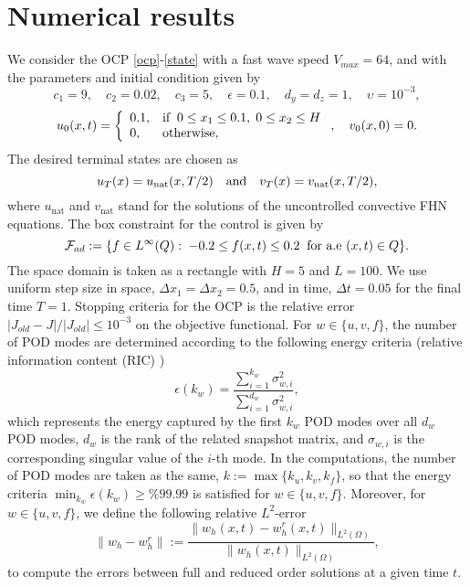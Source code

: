 \documentclass[preprint,12pt]{elsarticle}
\begin{document}
\section{Numerical results}
\label{numeric}

We consider the OCP \eqref{ocp}-\eqref{state} with a fast wave speed $V_{max}=64$, and with the parameters and initial condition given by
\[
c_1=9, \quad c_2 = 0.02, \quad c_3 = 5, \quad \epsilon = 0.1, \quad d_{y}=d_{z}=1, \quad \upsilon =10^{-3},
\]
\[
u_0(x,t) = \left\{
             \begin{array}{ll}
               0.1, & \hbox{if} \;\; 0 \leq x_1 \leq 0.1,\; 0 \leq x_2 \leq H  \\
               0, & \hbox{otherwise},
             \end{array}
           \right.
, \quad
v_0(x,0) = 0.
\]
The desired terminal states are chosen as
\[
u_T(x) = u_{\mathrm{nat}}(x,T/2) \quad \hbox{and} \quad v_T(x) = v_{\mathrm{nat}}(x,T/2),
\]
where $u_{\mathrm{nat}}$ and $v_{\mathrm{nat}}$ stand for the solutions of the uncontrolled convective FHN equations. The box constraint for the control is given by
\[
\mathcal{F}_{ad} := \{ f \in L^{\infty}(Q): \; -0.2 \leq f(x,t) \leq 0.2 \;\; \hbox{for   a.e   } (x,t) \in Q \}.
\]
The space domain is taken as a rectangle with $H=5$ and $L=100$. We use uniform step size in space, $\Delta x_{1}=\Delta x_{2} =0.5$, and in time, $\Delta t=0.05$ for the final time $T=1$. Stopping criteria for the OCP is the relative error $|J_{old}-J|/ |J_{old}| \leq 10^{-3}$ on the objective functional.
For $w\in\{u,v,f\}$, the number of POD modes are determined according to the following energy criteria (relative information content (RIC) )
\begin{equation*}
\epsilon(k_w)=\frac{\sum_{i=1}^{k_w}\sigma_{w,i}^2}{\sum_{i=1}^{d_w}\sigma_{w,i}^2},
\end{equation*}
which represents the energy captured by the first $k_w$ POD modes over all $d_w$ POD modes, $d_w$ is the rank of the related snapshot matrix, and $\sigma_{w,i}$ is the corresponding singular value of the $i$-th mode. In the computations, the number of POD modes are taken as the same, $k:=\max\{k_u,k_v,k_f\}$, so that the energy criteria $\min_{k_w} \epsilon(k_w) \geq \%99.99$ is satisfied for $w\in\{u,v,f\}$. Moreover, for $w\in\{u,v,f\}$, we define the following relative $L^2$-error
\[
\|w_h-w_h^r\|:= \frac{\|w_h(x,t)-w_h^r(x,t)\|_{L^2(\Omega)}}{\|w_h(x,t)\|_{L^2(\Omega)}},
\]
to compute the errors between full and reduced order solutions at a given time $t$.
\end{document}
